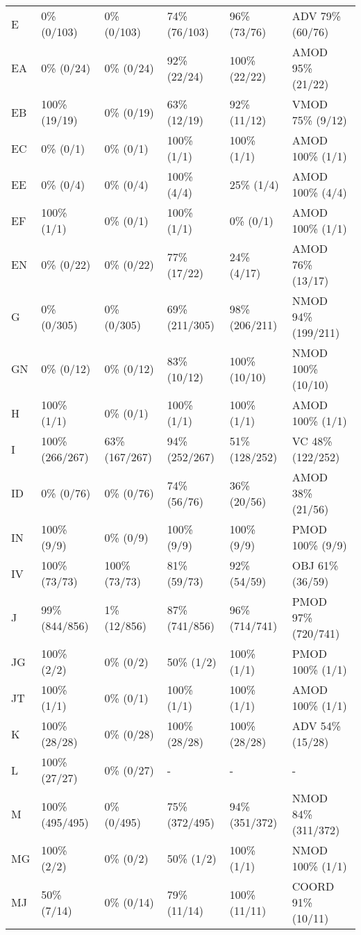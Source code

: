 \begin{small}
\begin{longtable}{|l|l|l|l|l|l|}
E & 0\% (0/103) & 0\% (0/103) & 74\% (76/103) & 96\% (73/76) & ADV 79\% (60/76) \\ 
EA & 0\% (0/24) & 0\% (0/24) & 92\% (22/24) & 100\% (22/22) & AMOD 95\% (21/22) \\ 
EB & 100\% (19/19) & 0\% (0/19) & 63\% (12/19) & 92\% (11/12) & VMOD 75\% (9/12) \\ 
EC & 0\% (0/1) & 0\% (0/1) & 100\% (1/1) & 100\% (1/1) & AMOD 100\% (1/1) \\ 
EE & 0\% (0/4) & 0\% (0/4) & 100\% (4/4) & 25\% (1/4) & AMOD 100\% (4/4) \\ 
EF & 100\% (1/1) & 0\% (0/1) & 100\% (1/1) & 0\% (0/1) & AMOD 100\% (1/1) \\ 
EN & 0\% (0/22) & 0\% (0/22) & 77\% (17/22) & 24\% (4/17) & AMOD 76\% (13/17) \\ 
G & 0\% (0/305) & 0\% (0/305) & 69\% (211/305) & 98\% (206/211) & NMOD 94\% (199/211) \\ 
GN & 0\% (0/12) & 0\% (0/12) & 83\% (10/12) & 100\% (10/10) & NMOD 100\% (10/10) \\ 
H & 100\% (1/1) & 0\% (0/1) & 100\% (1/1) & 100\% (1/1) & AMOD 100\% (1/1) \\ 
I & 100\% (266/267) & 63\% (167/267) & 94\% (252/267) & 51\% (128/252) & VC 48\% (122/252) \\ 
ID & 0\% (0/76) & 0\% (0/76) & 74\% (56/76) & 36\% (20/56) & AMOD 38\% (21/56) \\ 
IN & 100\% (9/9) & 0\% (0/9) & 100\% (9/9) & 100\% (9/9) & PMOD 100\% (9/9) \\ 
IV & 100\% (73/73) & 100\% (73/73) & 81\% (59/73) & 92\% (54/59) & OBJ 61\% (36/59) \\ 
J & 99\% (844/856) & 1\% (12/856) & 87\% (741/856) & 96\% (714/741) & PMOD 97\% (720/741) \\ 
JG & 100\% (2/2) & 0\% (0/2) & 50\% (1/2) & 100\% (1/1) & PMOD 100\% (1/1) \\ 
JT & 100\% (1/1) & 0\% (0/1) & 100\% (1/1) & 100\% (1/1) & AMOD 100\% (1/1) \\ 
K & 100\% (28/28) & 0\% (0/28) & 100\% (28/28) & 100\% (28/28) & ADV 54\% (15/28) \\ 
L & 100\% (27/27) & 0\% (0/27) & - & - & - \\ 
M & 100\% (495/495) & 0\% (0/495) & 75\% (372/495) & 94\% (351/372) & NMOD 84\% (311/372) \\ 
MG & 100\% (2/2) & 0\% (0/2) & 50\% (1/2) & 100\% (1/1) & NMOD 100\% (1/1) \\ 
MJ & 50\% (7/14) & 0\% (0/14) & 79\% (11/14) & 100\% (11/11) & COORD 91\% (10/11) \\ 

\end{longtable}
\end{small}
